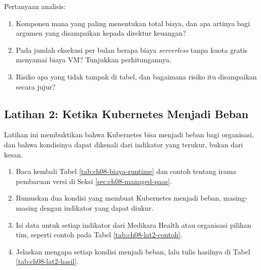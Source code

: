 Pertanyaan analisis:
\begin{enumerate}
  \item Komponen mana yang paling menentukan total biaya, dan apa artinya bagi argumen yang
        disampaikan kepada direktur keuangan?
  \item Pada jumlah eksekusi per bulan berapa biaya \textit{serverless} tanpa kuota gratis menyamai
        biaya VM? Tunjukkan perhitungannya.
  \item Risiko apa yang tidak tampak di tabel, dan bagaimana risiko itu disampaikan secara jujur?
\end{enumerate}

\subsection*{Latihan 2: Ketika Kubernetes Menjadi Beban}

Latihan ini membuktikan bahwa Kubernetes bisa menjadi beban bagi organisasi, dan bahwa kondisinya
dapat dikenali dari indikator yang terukur, bukan dari kesan.

\begin{enumerate}
  \item Baca kembali Tabel \ref{tab:ch08-biaya-runtime} dan contoh tentang irama pembaruan versi
        di Seksi \ref{sec:ch08-managed-paas}.
  \item Rumuskan dua kondisi yang membuat Kubernetes menjadi beban, masing-masing dengan indikator
        yang dapat diukur.
  \item Isi data untuk setiap indikator dari Medikara Health atau organisasi pilihan tim, seperti
        contoh pada Tabel \ref{tab:ch08-lat2-contoh}.
  \item Jelaskan mengapa setiap kondisi menjadi beban, lalu tulis hasilnya di Tabel
        \ref{tab:ch08-lat2-hasil}.
\end{enumerate}

